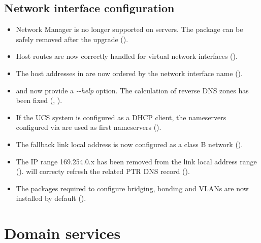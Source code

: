 \subsection{Network interface configuration}
\begin{itemize}
\item Network Manager is no longer supported on servers. The package
   can be safely removed after the
  upgrade ().
\item Host routes are now correctly handled for virtual network
  interfaces ().
\item The host addresses in  are now ordered by
  the network interface name ().
\item {} and  now provide a \emph{-{}-help}
  option. The calculation of reverse DNS zones has been fixed
  (, ).
\item If the UCS system is configured as a DHCP client, the
  nameservers configured via \ucsUCR{} are used as first nameservers
  ().
\item The fallback link local address is  now configured as a
  class B network ().
\item The IP range 169.254.0.x has been removed from the link local
  address range ().
 will correcty refresh
the related PTR DNS record ().
\item The packages required to configure bridging, bonding and VLANs
  are now installed by default ().
\end{itemize}




\section{Domain services}
